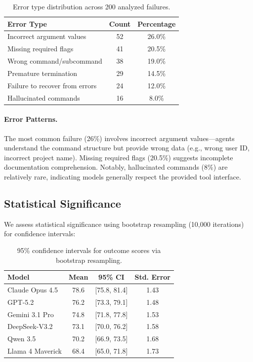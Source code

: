 \documentclass{article}
\begin{document}
\begin{table}[h]
\centering
\caption{Error type distribution across 200 analyzed failures.}
\label{tab:errors}
\begin{tabular}{lcc}
\toprule
\textbf{Error Type} & \textbf{Count} & \textbf{Percentage} \\
\midrule
Incorrect argument values & 52 & 26.0\% \\
Missing required flags & 41 & 20.5\% \\
Wrong command/subcommand & 38 & 19.0\% \\
Premature termination & 29 & 14.5\% \\
Failure to recover from errors & 24 & 12.0\% \\
Hallucinated commands & 16 & 8.0\% \\
\bottomrule
\end{tabular}
\end{table}

\paragraph{Error Patterns.} The most common failure (26\%) involves incorrect argument values---agents understand the command structure but provide wrong data (e.g., wrong user ID, incorrect project name). Missing required flags (20.5\%) suggests incomplete documentation comprehension. Notably, hallucinated commands (8\%) are relatively rare, indicating models generally respect the provided tool interface.

\subsection{Statistical Significance}

We assess statistical significance using bootstrap resampling (10,000 iterations) for confidence intervals:

\begin{table}[h]
\centering
\caption{95\% confidence intervals for outcome scores via bootstrap resampling.}
\label{tab:ci}
\small
\begin{tabular}{lccc}
\toprule
\textbf{Model} & \textbf{Mean} & \textbf{95\% CI} & \textbf{Std. Error} \\
\midrule
Claude Opus 4.5 & 78.6 & [75.8, 81.4] & 1.43 \\
GPT-5.2 & 76.2 & [73.3, 79.1] & 1.48 \\
Gemini 3.1 Pro & 74.8 & [71.8, 77.8] & 1.53 \\
DeepSeek-V3.2 & 73.1 & [70.0, 76.2] & 1.58 \\
Qwen 3.5 & 70.2 & [66.9, 73.5] & 1.68 \\
Llama 4 Maverick & 68.4 & [65.0, 71.8] & 1.73 \\
\bottomrule
\end{tabular}
\end{table}
\end{document}
